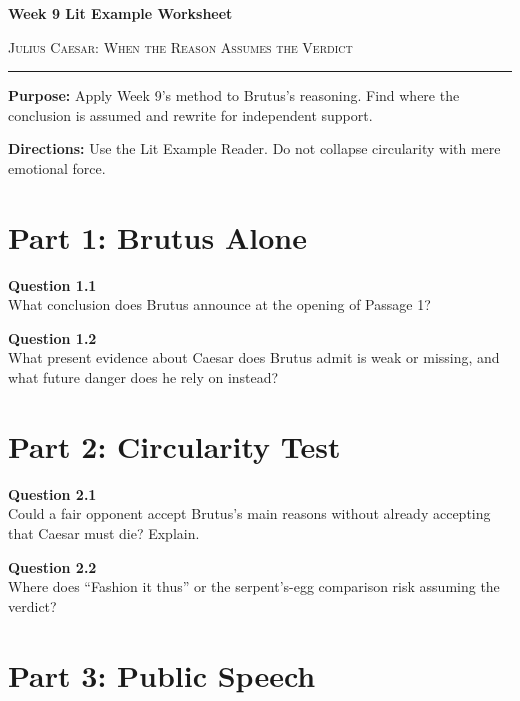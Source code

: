 \documentclass[12pt]{article}
\begin{document}
\begin{center}
{\LARGE\bfseries Week 9 Lit Example Worksheet}\par\vspace{0.05em}
{\large\scshape Julius Caesar: When the Reason Assumes the Verdict}\par\vspace{0.12em}
\rule{0.78\textwidth}{0.5pt}
\end{center}

\textbf{Purpose:} Apply Week 9's method to Brutus's reasoning. Find where the conclusion is assumed and rewrite for independent support.

\textbf{Directions:} Use the Lit Example Reader. Do not collapse circularity with mere emotional force.

\section*{Part 1: Brutus Alone}

\textbf{Question 1.1}\\[-0.15em]
What conclusion does Brutus announce at the opening of Passage 1?


\textbf{Question 1.2}\\[-0.15em]
What present evidence about Caesar does Brutus admit is weak or missing, and what future danger does he rely on instead?


\newpage

\section*{Part 2: Circularity Test}

\textbf{Question 2.1}\\[-0.15em]
Could a fair opponent accept Brutus's main reasons without already accepting that Caesar must die? Explain.


\textbf{Question 2.2}\\[-0.15em]
Where does ``Fashion it thus'' or the serpent's-egg comparison risk assuming the verdict?


\newpage

\section*{Part 3: Public Speech}
\end{document}

